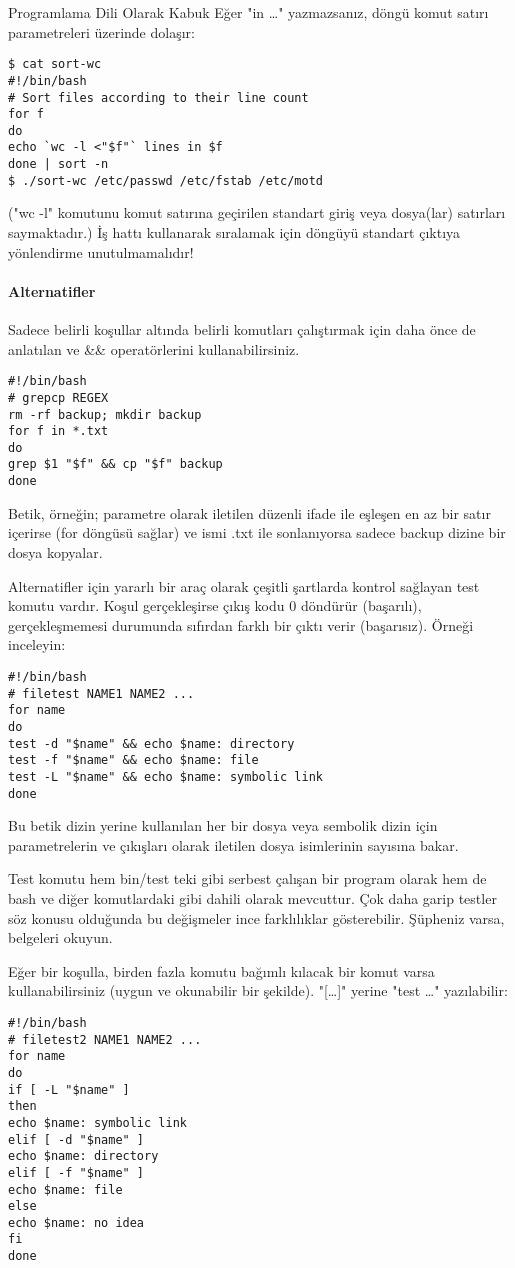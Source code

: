 \begin{section}{Programlama Dili Olarak Kabuk}
Eğer "in \ldots" yazmazsanız, döngü komut satırı parametreleri üzerinde dolaşır:
\begin{verbatim}
$ cat sort-wc
#!/bin/bash
# Sort files according to their line count
for f
do
echo `wc -l <"$f"` lines in $f
done | sort -n
$ ./sort-wc /etc/passwd /etc/fstab /etc/motd
\end{verbatim}

("wc -l" komutunu komut satırına geçirilen standart giriş veya dosya(lar) satırları saymaktadır.) İş hattı kullanarak sıralamak için döngüyü standart çıktıya yönlendirme unutulmamalıdır!

\paragraph{Alternatifler}{ Sadece belirli koşullar altında belirli komutları çalıştırmak için daha önce de anlatılan \textbar \textbar ve \&\& operatörlerini kullanabilirsiniz.
\begin{verbatim}
#!/bin/bash
# grepcp REGEX
rm -rf backup; mkdir backup
for f in *.txt
do
grep $1 "$f" && cp "$f" backup
done
\end{verbatim}
}

Betik, örneğin; parametre olarak iletilen düzenli ifade ile eşleşen en az bir satır içerirse (for döngüsü sağlar) ve ismi .txt ile sonlanıyorsa sadece backup dizine bir dosya kopyalar.

Alternatifler için yararlı bir araç olarak çeşitli şartlarda kontrol sağlayan test komutu vardır. Koşul gerçekleşirse çıkış kodu 0 döndürür (başarılı), gerçekleşmemesi durumunda sıfırdan farklı bir çıktı verir (başarısız). Örneği inceleyin:
\begin{verbatim}
#!/bin/bash
# filetest NAME1 NAME2 ...
for name
do
test -d "$name" && echo $name: directory
test -f "$name" && echo $name: file
test -L "$name" && echo $name: symbolic link
done
\end{verbatim}

Bu betik dizin yerine kullanılan her bir dosya veya sembolik dizin için parametrelerin ve çıkışları olarak iletilen dosya isimlerinin sayısına bakar.

Test komutu hem bin/test teki gibi serbest çalışan bir program olarak hem de bash ve diğer komutlardaki gibi dahili olarak mevcuttur. Çok daha garip testler söz konusu olduğunda bu değişmeler ince farklılıklar gösterebilir. Şüpheniz varsa, belgeleri okuyun.

Eğer bir koşulla, birden fazla komutu bağımlı kılacak bir komut varsa kullanabilirsiniz (uygun ve okunabilir bir şekilde). "[\ldots]" yerine "test \ldots" yazılabilir:
\begin{verbatim}
#!/bin/bash
# filetest2 NAME1 NAME2 ...
for name
do
if [ -L "$name" ]
then
echo $name: symbolic link
elif [ -d "$name" ]
echo $name: directory
elif [ -f "$name" ]
echo $name: file
else
echo $name: no idea
fi
done
\end{verbatim}


\end{section}
